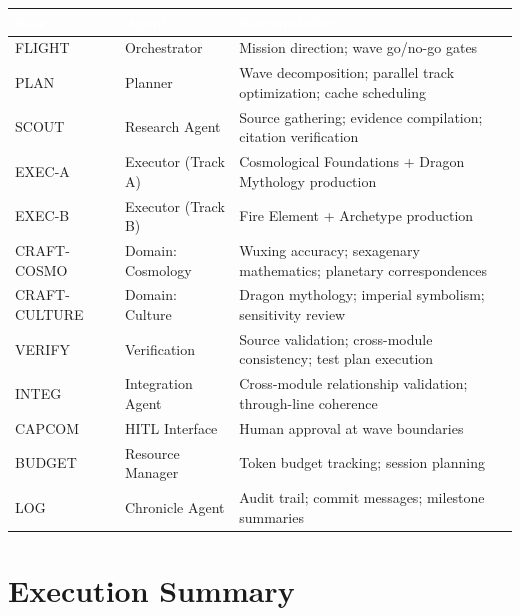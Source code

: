\documentclass[11pt,letterpaper]{article}
\newcommand{\tableheader}[1]{\textbf{\sffamily\textcolor{white}{#1}}}
\begin{document}
\begin{center}
\begin{tabularx}{\textwidth}{L{2cm}L{2.5cm}X}
\toprule
{}
\tableheader{Role} & \tableheader{Agent} & \tableheader{Responsibility} \\
\midrule
FLIGHT & Orchestrator & Mission direction; wave go/no-go gates \\
PLAN & Planner & Wave decomposition; parallel track optimization; cache scheduling \\
SCOUT & Research Agent & Source gathering; evidence compilation; citation verification \\
EXEC-A & Executor (Track A) & Cosmological Foundations + Dragon Mythology production \\
EXEC-B & Executor (Track B) & Fire Element + Archetype production \\
CRAFT-COSMO & Domain: Cosmology & Wuxing accuracy; sexagenary mathematics; planetary correspondences \\
CRAFT-CULTURE & Domain: Culture & Dragon mythology; imperial symbolism; sensitivity review \\
VERIFY & Verification & Source validation; cross-module consistency; test plan execution \\
INTEG & Integration Agent & Cross-module relationship validation; through-line coherence \\
CAPCOM & HITL Interface & Human approval at wave boundaries \\
BUDGET & Resource Manager & Token budget tracking; session planning \\
LOG & Chronicle Agent & Audit trail; commit messages; milestone summaries \\
\bottomrule
\end{tabularx}
\end{center}

\section{Execution Summary}
\end{document}
